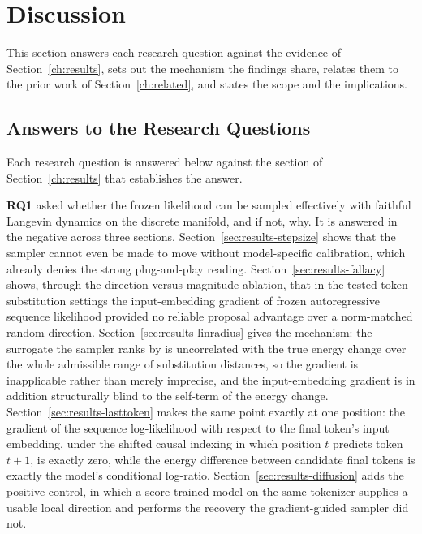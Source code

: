 \section{Discussion}
\label{ch:discussion}

This section answers each research question against the evidence of Section~\ref{ch:results}, sets out the mechanism the findings share, relates them to the prior work of Section~\ref{ch:related}, and states the scope and the implications.

\subsection{Answers to the Research Questions}
\label{sec:disc-rqs}

Each research question is answered below against the section of Section~\ref{ch:results} that establishes the answer.

\textbf{RQ1} asked whether the frozen likelihood can be sampled effectively with faithful Langevin dynamics on the discrete manifold, and if not, why. It is answered in the negative across three sections. Section~\ref{sec:results-stepsize} shows that the sampler cannot even be made to move without model-specific calibration, which already denies the strong plug-and-play reading. Section~\ref{sec:results-fallacy} shows, through the direction-versus-magnitude ablation, that in the tested token-substitution settings the input-embedding gradient of frozen autoregressive sequence likelihood provided no reliable proposal advantage over a norm-matched random direction. Section~\ref{sec:results-linradius} gives the mechanism: the surrogate the sampler ranks by is uncorrelated with the true energy change over the whole admissible range of substitution distances, so the gradient is inapplicable rather than merely imprecise, and the input-embedding gradient is in addition structurally blind to the self-term of the energy change. Section~\ref{sec:results-lasttoken} makes the same point exactly at one position: the gradient of the sequence log-likelihood with respect to the final token's input embedding, under the shifted causal indexing in which position $t$ predicts token $t+1$, is exactly zero, while the energy difference between candidate final tokens is exactly the model's conditional log-ratio. Section~\ref{sec:results-diffusion} adds the positive control, in which a score-trained model on the same tokenizer supplies a usable local direction and performs the recovery the gradient-guided sampler did not.

